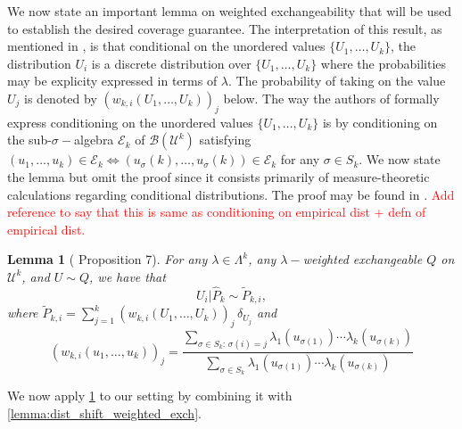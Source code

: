 \documentclass[11pt, titlepage]{article} %
\numberwithin{equation}{section}
\newtheorem{lemma}{Lemma}
\theoremstyle{definition}
\numberwithin{theorem}{section}
\numberwithin{lemma}{section}
\numberwithin{corollary}{section}
\numberwithin{proposition}{section}
\numberwithin{definition}{section}
\numberwithin{remark}{section}
\begin{document}
\noindent
We now state an important lemma on weighted exchangeability that will be used to establish the desired coverage guarantee. The interpretation of this result, as mentioned in \cite{barber2024finetti}, is that conditional on the unordered values \(\{U_1, \ldots, U_k\}\), the distribution \(U_i\) is a discrete distribution over \(\{U_1, \ldots, U_k\}\) where the probabilities may be explicity expressed in terms of \(\lambda\). The probability of taking on the value \(U_j\) is denoted by \(\left(w_{k, i}(U_1, \ldots, U_k)\right)_j\) below. The way the authors of \cite{barber2024finetti} formally express conditioning on the unordered values \(\{U_1, \ldots, U_k\}\) is by conditioning on the sub-\(\sigma-\)algebra \(\mathcal{E}_k\) of \(\mathcal{B}(\mathcal{U}^k)\) satisfying \((u_1, \ldots, u_k) \in \mathcal{E}_k \iff (u_\sigma(k), \ldots, u_\sigma(k)) \in \mathcal{E}_k\) for any \(\sigma \in S_k\). We now state the lemma but omit the proof since it consists primarily of measure-theoretic calculations regarding conditional distributions. The proof may be found in \cite{barber2024finetti}. \textcolor{red}{Add reference to say that this is same as conditioning on empirical dist + defn of empirical dist.} \vskip5pt

\noindent

\begin{lemma}[\cite{barber2024finetti} Proposition 7]
    For any \(\lambda \in \Lambda^k\), any \(\lambda-\)weighted exchangeable \(Q\) on \(\mathcal{U}^k\), and \(U \sim Q\), we have that \[U_i | \hat{P}_k \sim \tilde{P}_{k, i}, \] where \(\tilde{P}_{k, i} = \sum_{j=1}^{k} \left(w_{k, i}(U_1, \ldots, U_k)\right)_j \, \delta_{U_j}\) and \[\left(w_{k, i}(u_1, \ldots, u_k)\right)_j = \frac{ \sum_{\sigma \in S_k : \, \sigma(i) = j} \lambda_1(u_{\sigma(1)}) \cdots \lambda_k(u_{\sigma(k)})  }{\sum_{\sigma \in S_k} \lambda_1(u_{\sigma(1)}) \cdots \lambda_k(u_{\sigma(k)})}\]
\label{lemma:weighted_exch_conditional_lemma}
\end{lemma}

\noindent
We now apply \cref{lemma:weighted_exch_conditional_lemma} to our setting by combining it with \cref{lemma:dist_shift_weighted_exch}.
\end{document}
